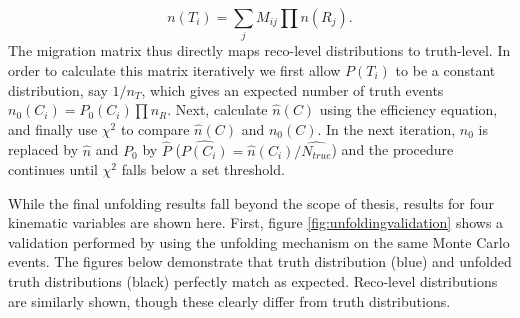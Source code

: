 \begin{equation}
n(T_i)=\sum_j M_{ij} \prod n(R_j).
\end{equation}
The migration matrix thus directly maps reco-level distributions to truth-level. In order to calculate this matrix iteratively we first allow $P(T_i)$ to be a constant distribution, say $1/n_T$, which gives an expected number of truth events $n_0(C_i)=P_0(C_i)\prod n_R$. Next, calculate $\hat{n}(C)$ using the efficiency equation, and finally use $\chi^2$ to compare $\hat{n}(C)$ and $n_0(C)$. In the next iteration, $n_0$ is replaced by $\hat{n}$ and $P_0$ by $\hat{P}$ ($\hat{P(C_i)}=\hat{n}(C_i)/\hat{N_{true}}$) and the procedure continues until $\chi^2$ falls below a set threshold. 

While the final unfolding results fall beyond the scope of thesis, results for four kinematic variables are shown here. First, figure \ref{fig:unfoldingvalidation} shows a validation performed by using the unfolding mechanism on the same Monte Carlo events. The figures below demonstrate that truth distribution (blue) and unfolded truth distributions (black) perfectly match as expected. Reco-level distributions are similarly shown, though these clearly differ from truth distributions. 

